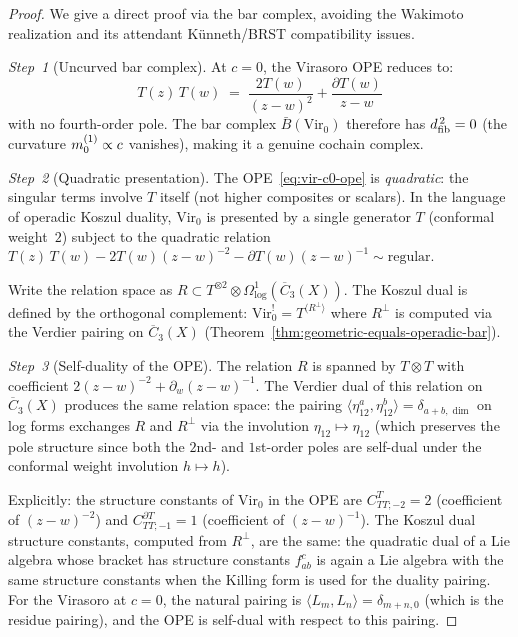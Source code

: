\begin{proof}
We give a direct proof via the bar complex, avoiding the Wakimoto
realization and its attendant K\"unneth/BRST compatibility issues.

\emph{Step~1} (Uncurved bar complex).
At $c = 0$, the Virasoro OPE reduces to:
\begin{equation}\label{eq:vir-c0-ope}
T(z)\,T(w) \;=\; \frac{2T(w)}{(z-w)^2} + \frac{\partial T(w)}{z-w}
\end{equation}
with no fourth-order pole.  The bar complex
$\bar{B}(\mathrm{Vir}_0)$ therefore has $d_{\mathrm{fib}}^{\,2} = 0$ (the curvature
$m_0^{(1)} \propto c$ vanishes), making it a genuine cochain complex.

\emph{Step~2} (Quadratic presentation).
The OPE~\eqref{eq:vir-c0-ope} is \emph{quadratic}: the singular terms
involve $T$ itself (not higher composites or scalars).
In the language of operadic Koszul duality, $\mathrm{Vir}_0$ is presented
by a single generator $T$ (conformal weight~$2$) subject to the quadratic
relation $T(z)\,T(w) - 2T(w)(z-w)^{-2} - \partial T(w)(z-w)^{-1}
\sim \text{regular}$.

Write the relation space as $R \subset T^{\otimes 2} \otimes
\Omega^1_{\log}(\overline{C}_3(X))$.  The Koszul dual is defined by the
orthogonal complement:
$\mathrm{Vir}_0^! = T^{\langle R^\perp \rangle}$
where $R^\perp$ is computed via the Verdier pairing on
$\overline{C}_3(X)$ (Theorem~\ref{thm:geometric-equals-operadic-bar}).

\emph{Step~3} (Self-duality of the OPE).
The relation $R$ is spanned by $T \otimes T$ with coefficient
$2(z-w)^{-2} + \partial_w(z-w)^{-1}$.  The Verdier dual of this relation
on $\overline{C}_3(X)$ produces the same relation space:
the pairing $\langle \eta_{12}^a, \eta_{12}^b \rangle =
\delta_{a+b, \dim}$ on log forms exchanges $R$ and $R^\perp$ via the
involution $\eta_{12} \mapsto \eta_{12}$ (which preserves the pole
structure since both the $2$nd- and $1$st-order poles are self-dual under
the conformal weight involution $h \mapsto h$).

Explicitly: the structure constants of $\mathrm{Vir}_0$ in the OPE
are $C^T_{TT;-2} = 2$ (coefficient of $(z-w)^{-2}$) and
$C^{\partial T}_{TT;-1} = 1$ (coefficient of $(z-w)^{-1}$).
The Koszul dual structure constants, computed from
$R^\perp$, are the same: the quadratic dual of a Lie algebra
whose bracket has structure constants $f^c_{ab}$ is again a Lie algebra
with the same structure constants when the Killing form is used for
the duality pairing.  For the Virasoro at $c = 0$, the natural pairing
is $\langle L_m, L_n \rangle = \delta_{m+n,0}$ (which is the residue
pairing), and the OPE is self-dual with respect to this pairing.


\end{proof}
